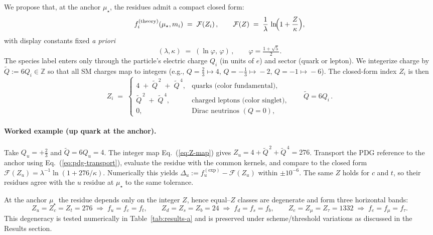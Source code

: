 \documentclass[aps,prd,onecolumn,amsmath,amssymb,superscriptaddress,nofootinbib,showpacs,showkeys]{revtex4-2}
\begin{document}
We propose that, at the anchor $\mu_\star$, the residues admit a compact closed  form:
\begin{equation}
  f_i^{\mathrm{(theory)}}(\mu_\star,m_i)\;=\;\mathcal F(Z_i)\,,
  \qquad
  \mathcal F(Z)\;=\;\frac{1}{\lambda}\,\ln\!\Bigl(1+\frac{Z}{\kappa}\Bigr),
  \label{eq:gap-def}
\end{equation}
with display constants fixed \emph{a priori}
\[
(\lambda,\kappa)\;=\;(\ln\varphi,\,\varphi)\,,\qquad \varphi=\tfrac{1+\sqrt5}{2}. 
\]
 The species label enters only through the particle's electric charge $Q_i$ (in units of $e$) and sector (quark or lepton). We integerize charge by $\tilde Q:=6Q_i\in\mathbb{Z}$ so that all SM charges map to integers (e.g., $Q=\tfrac{2}{3}\!\mapsto\!4$, $Q=-\tfrac{1}{3}\!\mapsto\!-2$, $Q=-1\!\mapsto\!-6$). The closed-form index $Z_i$ is then
\begin{equation}
  Z_i\;=\;
  \begin{cases}
    4\;+\;\tilde Q^{\,2}\;+\;\tilde Q^{\,4}, & \text{quarks (color fundamental)},\\[3pt]
    \tilde Q^{\,2}\;+\;\tilde Q^{\,4}, & \text{charged leptons (color singlet)},\\[3pt]
    0, & \text{Dirac neutrinos }(Q=0),
  \end{cases}
  \qquad \tilde Q=6Q_i\,.
  \label{eq:Z-map}
\end{equation}




\paragraph{Worked example (up quark at the anchor).}
Take $Q_u=+\tfrac{2}{3}$ and $\tilde Q=6Q_u=4$. The integer map Eq.~(\ref{eq:Z-map})
gives $Z_u=4+\tilde Q^{\,2}+\tilde Q^{\,4}=276$. Transport the PDG reference to the anchor using Eq.~(\ref{eq:pdg-transport}), evaluate the residue with the common kernels, and compare to the closed form $\mathcal F(Z_u)=\lambda^{-1}\ln(1+276/\kappa)$. Numerically this yields $\Delta_u:=f_u^{\mathrm{(exp)}}-\mathcal F(Z_u)$ within $\pm10^{-6}$. The same $Z$ holds for $c$ and $t$, so their residues agree with the $u$ residue at $\mu_\star$ to the same tolerance.


At the anchor $\mu_\star$ the residue depends only on the integer $Z$, hence equal--$Z$ classes are degenerate and form three horizontal bands:
\[
Z_u=Z_c=Z_t=276 \;\Longrightarrow\; f_u=f_c=f_t,\qquad
Z_d=Z_s=Z_b=24 \;\Longrightarrow\; f_d=f_s=f_b,\qquad
Z_e=Z_\mu=Z_\tau=1332 \;\Longrightarrow\; f_e=f_\mu=f_\tau.
\]
This degeneracy is tested numerically in Table~\ref{tab:results-a} and is preserved under scheme/threshold variations as discussed in the Results section.
\end{document}

